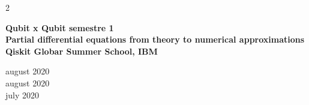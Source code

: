 \documentclass[a3paper,16pt]{adcv}
\begin{document}
\begin{multicols}{2}
\begin{minipage}{0.7\linewidth}
  \textbf{Qubit x Qubit semestre 1}\\
  \textbf{Partial differential equations from theory to numerical approximations}\\
  \textbf{Qiskit Globar Summer School, IBM}
\end{minipage}
\begin{minipage}{0.3\linewidth}
  \begin{flushright}
  august 2020\\
  august 2020\vspace{1cm}\\

  july 2020
\end{flushright}
\end{minipage}
  
  
  
  
  
  


\end{multicols}
\end{document}
